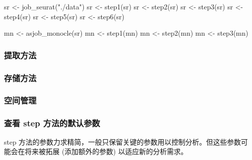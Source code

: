 \documentclass[
]{article}
\newenvironment{Shaded}{\begin{snugshade}}{\end{snugshade}}
\newcommand{\FunctionTok}[1]{\textcolor[rgb]{0.00,0.00,0.00}{#1}}
\newcommand{\NormalTok}[1]{#1}
\newcommand{\OtherTok}[1]{\textcolor[rgb]{0.56,0.35,0.01}{#1}}
\newcommand{\StringTok}[1]{\textcolor[rgb]{0.31,0.60,0.02}{#1}}
\begin{document}
\begin{Shaded}
\begin{Highlighting}[]
\NormalTok{sr }\OtherTok{\textless{}{-}} \FunctionTok{job\_seurat}\NormalTok{(}\StringTok{"./data"}\NormalTok{)}
\NormalTok{sr }\OtherTok{\textless{}{-}} \FunctionTok{step1}\NormalTok{(sr)}
\NormalTok{sr }\OtherTok{\textless{}{-}} \FunctionTok{step2}\NormalTok{(sr)}
\NormalTok{sr }\OtherTok{\textless{}{-}} \FunctionTok{step3}\NormalTok{(sr)}
\NormalTok{sr }\OtherTok{\textless{}{-}} \FunctionTok{step4}\NormalTok{(sr)}
\NormalTok{sr }\OtherTok{\textless{}{-}} \FunctionTok{step5}\NormalTok{(sr)}
\NormalTok{sr }\OtherTok{\textless{}{-}} \FunctionTok{step6}\NormalTok{(sr)}

\NormalTok{mn }\OtherTok{\textless{}{-}} \FunctionTok{asjob\_monocle}\NormalTok{(sr)}
\NormalTok{mn }\OtherTok{\textless{}{-}} \FunctionTok{step1}\NormalTok{(mn)}
\NormalTok{mn }\OtherTok{\textless{}{-}} \FunctionTok{step2}\NormalTok{(mn)}
\NormalTok{mn }\OtherTok{\textless{}{-}} \FunctionTok{step3}\NormalTok{(mn)}
\end{Highlighting}
\end{Shaded}

\hypertarget{ux63d0ux53d6ux65b9ux6cd5}{%
\subsubsection{提取方法}\label{ux63d0ux53d6ux65b9ux6cd5}}

\hypertarget{ux5b58ux50a8ux65b9ux6cd5}{%
\subsubsection{存储方法}\label{ux5b58ux50a8ux65b9ux6cd5}}

\hypertarget{ux7a7aux95f4ux7ba1ux7406}{%
\subsubsection{空间管理}\label{ux7a7aux95f4ux7ba1ux7406}}

\hypertarget{ux67e5ux770b-step-ux65b9ux6cd5ux7684ux9ed8ux8ba4ux53c2ux6570}{%
\subsubsection{查看 step 方法的默认参数}\label{ux67e5ux770b-step-ux65b9ux6cd5ux7684ux9ed8ux8ba4ux53c2ux6570}}

step 方法的参数力求精简，一般只保留关键的参数用以控制分析。但这些参数可能会在将来被拓展 (添加额外的参数) 以适应新的分析需求。
\end{document}
